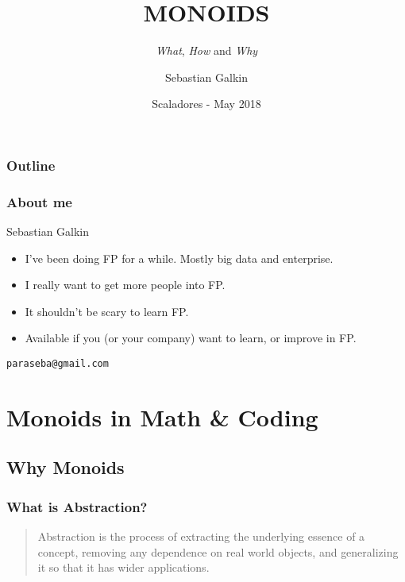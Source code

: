 \documentclass{beamer}
\title[Monoids]{MONOIDS}
\subtitle{\textit{What}, \textit{How} and \textit{Why}}
\author{Sebastian Galkin}
\institute[@paraseba]{\texttt{@paraseba} \\ \texttt{paraseba@gmail.com}}
\date[Scaladores]{Scaladores - May 2018}
\begin{document}

\begin{frame}
  \titlepage
\end{frame}

\begin{frame}
  \frametitle{Outline}
 \tableofcontents
\end{frame}


\begin{frame}
  \frametitle{About me}

  {\LARGE Sebastian Galkin}

  \begin{itemize}
    \item I've been doing \alert{FP} for a while. Mostly big data and enterprise.
    \item I \alert{really} want to get more people into FP.
    \item It shouldn't be scary to learn FP.
    \item Available if you (or your company) want to learn, or improve in FP.
  \end{itemize}

  \color{blue}\texttt{paraseba@gmail.com}

\end{frame}

\section{Monoids in Math \& Coding}
\subsection{Why Monoids}

\begin{frame}
  \frametitle{What is Abstraction?}
  \begin{quote}
Abstraction is the process of extracting the underlying \alert{essence} of a concept,
removing any \alert{dependence} on real world objects, and \alert{generalizing} it so that it
has \alert{wider applications.}\\[2pt] 
  \end{quote}

\end{frame}
\end{document}
